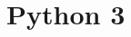 \documentclass[../Languages.tex]{subfiles}
\begin{document}
\section{Python 3}\label{sec:python_3}

\newpage
\end{document}
